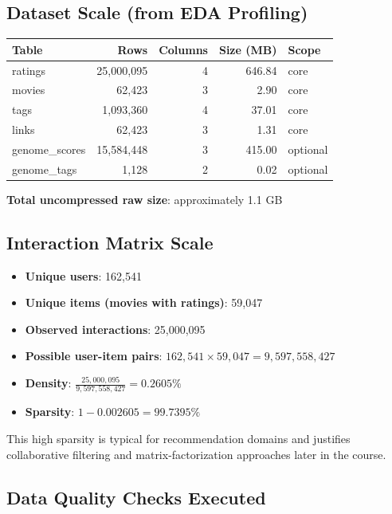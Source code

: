 \documentclass[11pt]{article}
\begin{document}
\subsection{Dataset Scale (from EDA Profiling)}

\begin{longtable}{@{}p{}r r r p{}@{}}
\toprule
\textbf{Table} & \textbf{Rows} & \textbf{Columns} & \textbf{Size (MB)} & \textbf{Scope} \\
\midrule
\endhead
ratings & 25,000,095 & 4 & 646.84 & core \\
movies & 62,423 & 3 & 2.90 & core \\
tags & 1,093,360 & 4 & 37.01 & core \\
links & 62,423 & 3 & 1.31 & core \\
genome\_scores & 15,584,448 & 3 & 415.00 & optional \\
genome\_tags & 1,128 & 2 & 0.02 & optional \\
\bottomrule
\end{longtable}

\textbf{Total uncompressed raw size}: approximately 1.1 GB

\subsection{Interaction Matrix Scale}

\begin{itemize}[leftmargin=1.5em]
    \item \textbf{Unique users}: 162,541
    \item \textbf{Unique items (movies with ratings)}: 59,047
    \item \textbf{Observed interactions}: 25,000,095
    \item \textbf{Possible user-item pairs}: $162{,}541 \times 59{,}047 = 9{,}597{,}558{,}427$
    \item \textbf{Density}: $\frac{25{,}000{,}095}{9{,}597{,}558{,}427} = 0.2605\%$
    \item \textbf{Sparsity}: $1 - 0.002605 = 99.7395\%$
\end{itemize}

This high sparsity is typical for recommendation domains and justifies collaborative filtering and matrix-factorization approaches later in the course.

\subsection{Data Quality Checks Executed}
\end{document}
